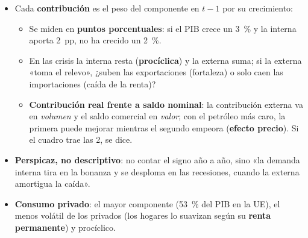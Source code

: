 \documentclass{article}
\begin{document}
\begin{columnas}
\begin{itemize}[itemsep=1.5pt]
\item Cada \textbf{contribución} es el peso del componente en $t-1$ por su crecimiento:
  \begin{itemize}
  \item Se miden en \textbf{puntos porcentuales}: si el PIB crece un 3~\% y la interna aporta 2~pp, no ha crecido un 2~\%.
  \item En las crisis la interna resta (\textbf{procíclica}) y la externa suma; si la externa «toma el relevo», ¿suben las exportaciones (fortaleza) o solo caen las importaciones (caída de la renta)?
  \item \textbf{Contribución real frente a saldo nominal}: la contribución externa va en \emph{volumen} y el saldo comercial en \emph{valor}; con el petróleo más caro, la primera puede mejorar mientras el segundo empeora (\textbf{efecto precio}). Si el cuadro trae las 2, se dice.
  \end{itemize}
\item \textbf{Perspicaz, no descriptivo}: no contar el signo año a año, sino «la demanda interna tira en la bonanza y se desploma en las recesiones, cuando la externa amortigua la caída».
\end{itemize}
\begin{itemize}[itemsep=1.5pt]
\item \textbf{Consumo privado}: el mayor componente (53~\% del PIB en la UE), el menos volátil de los privados (los hogares lo suavizan según su \textbf{renta permanente}) y procíclico.
  \begin{itemize}

\end{itemize}
\end{itemize}
\end{columnas}
\end{document}
